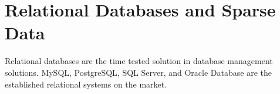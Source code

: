 \section{Relational Databases and Sparse Data}
Relational databases are the time tested solution in database management solutions.  MySQL\cite{MySQL:Site:Main}, PostgreSQL\cite{PostgreSQL:Site:Main}, SQL Server\cite{SQLServer:Site:Main}, and Oracle Database\cite{Oracle:Site:Main} are the established relational systems on the market.  